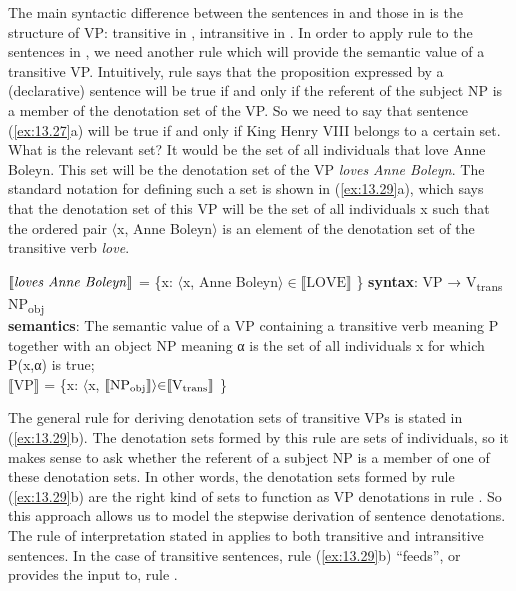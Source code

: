 The main syntactic difference between the sentences in  and those in  is the structure of VP: transitive in , intransitive in . In order to apply rule  to the sentences in , we need another rule which will provide the semantic value of a transitive VP. Intuitively, rule  says that the proposition expressed by a (declarative) sentence will be true if and only if the referent of the subject NP is a member of the denotation set of the VP. So we need to say that sentence (\ref{ex:13.27}a) will be true if and only if King Henry VIII belongs to a certain set. What is the relevant set? It would be the set of all individuals that love Anne Boleyn. This set will be the denotation set of the VP \textit{loves Anne Boleyn}. The standard notation for defining such a set is shown in (\ref{ex:13.29}a), which says that the denotation set of this VP will be the set of all individuals x such that the ordered pair $\langle$x, Anne Boleyn$\rangle$ is an element of the denotation set of the transitive verb \textit{love}.


\ea \label{ex:13.29}
\ea $\llbracket\text{\textit{loves Anne Boleyn}}\rrbracket$  = \{x: $\langle$x, Anne Boleyn$\rangle {\in} \llbracket\text{LOVE}\rrbracket$ \}
\ex \textbf{syntax}: VP  →  V\textsubscript{trans}  NP\textsubscript{obj}\\
\textbf{semantics}: The semantic value of a VP containing a transitive verb meaning P together with an object NP meaning α is the set of all individuals x for which P(x,α) is true;\\
{}$\llbracket\text{VP}\rrbracket$  =  \{x: $\langle$x, $\llbracket\text{NP\textsubscript{obj}}\rrbracket \rangle {\in} \llbracket\text{V\textsubscript{trans}}\rrbracket$ \}
\z \z


The general rule for deriving denotation sets of transitive VPs is stated in (\ref{ex:13.29}b). The denotation sets formed by this rule are sets of individuals, so it makes sense to ask whether the referent of a subject NP is a member of one of these denotation sets. In other words, the denotation sets formed by rule (\ref{ex:13.29}b) are the right kind of sets to function as VP denotations in rule . So this approach allows us to model the stepwise derivation of sentence denotations. The rule of interpretation stated in  applies to both transitive and intransitive sentences. In the case of transitive sentences, rule (\ref{ex:13.29}b) “feeds”, or provides the input to, rule .



